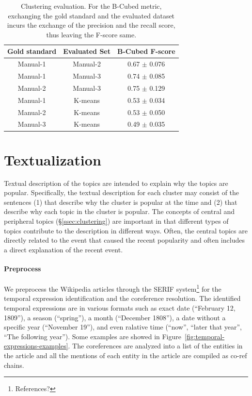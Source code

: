 \documentclass[11pt]{article}
\begin{document}
\begin{table}
\centering
\begin{tabular}{|c|c|c|}
\hline
Gold standard & Evaluated Set & B-Cubed F-score \\
\hline
Manual-1 & Manual-2 & 0.67 $\pm$ {\small 0.076} \\
Manual-1 & Manual-3 & 0.74 $\pm$ {\small 0.085} \\
Manual-2 & Manual-3 & 0.75 $\pm$ {\small 0.129} \\
\hline
Manual-1 & K-means & 0.53 $\pm$ {\small 0.034} \\
Manual-2 & K-means & 0.53 $\pm$ {\small 0.050} \\
Manual-3 & K-means & 0.49 $\pm$ {\small 0.035} \\
\hline
\end{tabular}
\caption{Clustering evaluation. For the B-Cubed metric, exchanging the gold standard and the evaluated dataset incurs the exchange of the precision and the recall score, thus leaving the F-score same.}
\label{tab:clustering}
\end{table}

\section{Textualization}

Textual description of the topics are intended to explain why the topics are popular.
Specifically, the textual description for each cluster may consist of the sentences (1) that describe why the cluster is popular at the time and (2) that describe why each topic in the cluster is popular.
The concepts of central and peripheral topics (\S\ref{ssec:clustering}) are important in that different types of topics contribute to the description in different ways.
Often, the central topics are directly related to the event that caused the recent popularity and often includes a direct explanation of the recent event. 

\paragraph {Preprocess}
We preprocess the Wikipedia articles through the SERIF system\footnote{References?} for the temporal expression identification and the coreference resolution.
The identified temporal expressions are in various formats such as exact date (``February 12, 1809''), a season (``spring''), a month (``December 1808''), a date without a specific year (``November 19''), and even ralative time (``now'', ``later that year'', ``The following year''). Some examples are showed in Figure~\ref{fig:temporal-expressions-examples}.
The coreferences are analyzed into a list of the entities in the article and all the mentions of each entity in the article are compiled as co-ref chains.
\end{document}
